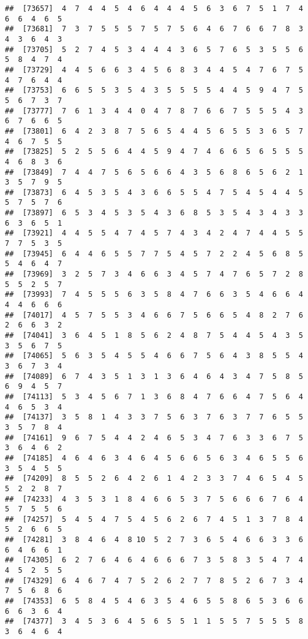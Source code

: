 \documentclass[
]{book}
\begin{document}
\begin{verbatim}
##  [73657]  4  7  4  4  5  4  6  4  4  4  5  6  3  6  7  5  1  7  4  6  6  4  6  5
##  [73681]  7  3  7  5  5  5  7  5  7  5  6  4  6  7  6  6  7  8  3  4  3  6  4  3
##  [73705]  5  2  7  4  5  3  4  4  4  3  6  5  7  6  5  3  5  5  6  5  8  4  7  4
##  [73729]  4  4  5  6  6  3  4  5  6  8  3  4  4  5  4  7  6  7  5  4  7  6  4  4
##  [73753]  6  6  5  5  3  5  4  3  5  5  5  5  4  4  5  9  4  7  5  5  6  7  3  7
##  [73777]  7  6  1  3  4  4  0  4  7  8  7  6  6  7  5  5  5  4  3  6  7  6  6  5
##  [73801]  6  4  2  3  8  7  5  6  5  4  4  5  6  5  5  3  6  5  7  4  6  7  5  5
##  [73825]  5  2  5  5  6  4  4  5  9  4  7  4  6  6  5  6  5  5  5  4  6  8  3  6
##  [73849]  7  4  4  7  5  6  5  6  6  4  3  5  6  8  6  5  6  2  1  3  5  7  9  5
##  [73873]  6  4  5  3  5  4  3  6  6  5  5  4  7  5  4  5  4  4  5  5  7  5  7  6
##  [73897]  6  5  3  4  5  3  5  4  3  6  8  5  3  5  4  3  4  3  3  6  3  6  5  1
##  [73921]  4  4  5  5  4  7  4  5  7  4  3  4  2  4  7  4  4  5  5  7  7  5  3  5
##  [73945]  6  4  4  6  5  5  7  7  5  4  5  7  2  2  4  5  6  8  5  5  4  6  4  7
##  [73969]  3  2  5  7  3  4  6  6  3  4  5  7  4  7  6  5  7  2  8  5  5  2  5  7
##  [73993]  7  4  5  5  5  6  3  5  8  4  7  6  6  3  5  4  6  6  4  4  4  6  6  6
##  [74017]  4  5  7  5  5  3  4  6  6  7  5  6  6  5  4  8  2  7  6  2  6  6  3  2
##  [74041]  3  6  4  5  1  8  5  6  2  4  8  7  5  4  4  5  4  3  5  3  5  6  7  5
##  [74065]  5  6  3  5  4  5  5  4  6  6  7  5  6  4  3  8  5  5  4  3  6  7  3  4
##  [74089]  6  7  4  3  5  1  3  1  3  6  4  6  4  3  4  7  5  8  5  6  9  4  5  7
##  [74113]  5  3  4  5  6  7  1  3  6  8  4  7  6  6  4  7  5  6  4  4  6  5  3  4
##  [74137]  3  5  8  1  4  3  3  7  5  6  3  7  6  3  7  7  6  5  5  3  5  7  8  4
##  [74161]  9  6  7  5  4  4  2  4  6  5  3  4  7  6  3  3  6  7  5  3  6  4  6  2
##  [74185]  4  6  4  6  3  4  6  4  5  6  6  5  6  3  4  6  5  5  6  3  5  4  5  5
##  [74209]  8  5  5  2  6  4  2  6  1  4  2  3  3  7  4  6  5  4  5  5  2  2  8  7
##  [74233]  4  3  5  3  1  8  4  6  6  5  3  7  5  6  6  6  7  6  4  5  7  5  5  6
##  [74257]  5  4  5  4  7  5  4  5  6  2  6  7  4  5  1  3  7  8  4  5  2  6  6  5
##  [74281]  3  8  4  6  4  8 10  5  2  7  3  6  5  4  6  6  3  3  6  6  4  6  6  1
##  [74305]  6  2  7  6  4  6  4  6  6  6  7  3  5  8  3  5  4  7  4  4  5  2  5  5
##  [74329]  6  4  6  7  4  7  5  2  6  2  7  7  8  5  2  6  7  3  4  7  5  6  8  6
##  [74353]  6  5  8  4  5  4  6  3  5  4  6  5  5  8  6  5  3  6  6  6  6  3  6  4
##  [74377]  3  4  5  3  6  4  5  6  5  5  1  1  5  5  7  5  5  5  8  3  6  4  6  4

\end{verbatim}
\end{document}

